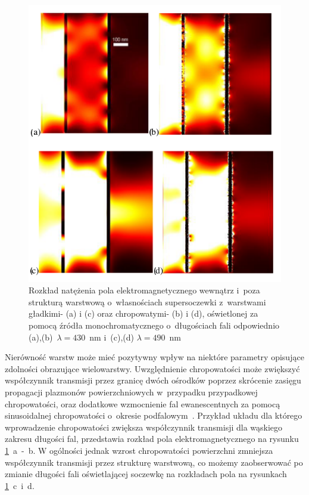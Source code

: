 \begin{figure}[!hbt]
	\begin{center}
	\includegraphics[width=.9\textwidth]{images/multilayer/plp-chropo.png}
	\end{center}
	\caption{Rozkład natężenia pola elektromagnetycznego wewnątrz i~poza strukturą warstwową o~własnościach supersoczewki z~warstwami gładkimi- (a) i (c) oraz chropowatymi- (b) i (d), oświetlonej za pomocą źródła monochromatycznego o~długościach fali odpowiednio (a),(b)~$\lambda=430$~nm  i~(c),(d) $\lambda=490$~nm~\cite{Stolarek_2013}}
	\label{fig:plp-chropo-fdtd}
\end{figure}

Nierówność warstw może mieć pozytywny wpływ na niektóre parametry opisujące zdolności obrazujące wielowarstwy. Uwzględnienie chropowatości może zwiększyć współczynnik transmisji przez granicę dwóch ośrodków poprzez skrócenie zasięgu propagacji plazmonów powierzchniowych w~przypadku przypadkowej chropowatości, oraz dodatkowe wzmocnienie fal ewanescentnych za pomocą sinusoidalnej chropowatości o~okresie podfalowym~\cite{huang2012subwavelength}. Przykład układu dla którego wprowadzenie chropowatości zwiększa współczynnik transmisji dla wąskiego zakresu długości fal, przedstawia rozkład pola elektromagnetycznego na rysunku \ref{fig:plp-chropo-fdtd}~a~-~b. W ogólności jednak wzrost chropowatości powierzchni zmniejsza współczynnik transmisji przez strukturę warstwową, co możemy zaobserwować po zmianie długości fali oświetlającej soczewkę na rozkładach pola na rysunkach \ref{fig:plp-chropo-fdtd}~c~i~d. 

